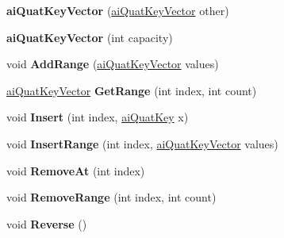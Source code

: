 \begin{DoxyCompactItemize}
\item 
\hypertarget{classai_quat_key_vector_acf1436de0752fc8fa68b0182b151f34b}{{\bfseries ai\+Quat\+Key\+Vector} (\hyperlink{classai_quat_key_vector}{ai\+Quat\+Key\+Vector} other)}\label{classai_quat_key_vector_acf1436de0752fc8fa68b0182b151f34b}

\item 
\hypertarget{classai_quat_key_vector_a9bacf5dc0680a5ef5ea7b451823b06ca}{{\bfseries ai\+Quat\+Key\+Vector} (int capacity)}\label{classai_quat_key_vector_a9bacf5dc0680a5ef5ea7b451823b06ca}

\item 
\hypertarget{classai_quat_key_vector_a4504f1f61fe442d8721d5c769e16595d}{void {\bfseries Add\+Range} (\hyperlink{classai_quat_key_vector}{ai\+Quat\+Key\+Vector} values)}\label{classai_quat_key_vector_a4504f1f61fe442d8721d5c769e16595d}

\item 
\hypertarget{classai_quat_key_vector_a001e78fd021cd99261ca475618a12a71}{\hyperlink{classai_quat_key_vector}{ai\+Quat\+Key\+Vector} {\bfseries Get\+Range} (int index, int count)}\label{classai_quat_key_vector_a001e78fd021cd99261ca475618a12a71}

\item 
\hypertarget{classai_quat_key_vector_aaf287aebb0d7e9a609a9054a339769b0}{void {\bfseries Insert} (int index, \hyperlink{structai_quat_key}{ai\+Quat\+Key} x)}\label{classai_quat_key_vector_aaf287aebb0d7e9a609a9054a339769b0}

\item 
\hypertarget{classai_quat_key_vector_a5fcf2a307ff6fcfd35e53a40629592fc}{void {\bfseries Insert\+Range} (int index, \hyperlink{classai_quat_key_vector}{ai\+Quat\+Key\+Vector} values)}\label{classai_quat_key_vector_a5fcf2a307ff6fcfd35e53a40629592fc}

\item 
\hypertarget{classai_quat_key_vector_aaf5fa7a9082fe7987e89858fae10a3c4}{void {\bfseries Remove\+At} (int index)}\label{classai_quat_key_vector_aaf5fa7a9082fe7987e89858fae10a3c4}

\item 
\hypertarget{classai_quat_key_vector_aa294d5c87f3f1272cfb0eff3e14cc986}{void {\bfseries Remove\+Range} (int index, int count)}\label{classai_quat_key_vector_aa294d5c87f3f1272cfb0eff3e14cc986}

\item 
\hypertarget{classai_quat_key_vector_a4dabe323fcd4a648894f4b26f832b36f}{void {\bfseries Reverse} ()}\label{classai_quat_key_vector_a4dabe323fcd4a648894f4b26f832b36f}


\end{DoxyCompactItemize}
